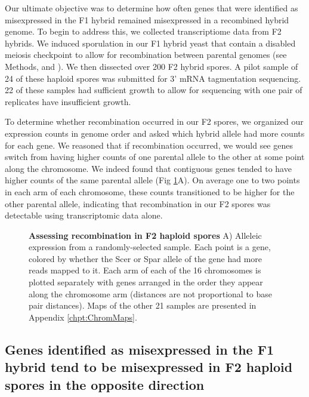Our ultimate objective was to determine how often genes that were identified as misexpressed in the F1 hybrid remained misexpressed in a recombined hybrid genome. To begin to address this, we collected transcriptiome data from F2 hybrids. We induced sporulation in our F1 hybrid yeast that contain a disabled meiosis checkpoint to allow for recombination between parental genomes (see Methods, and \cite{Bozdag2021}). We then dissected over 200 F2 hybrid spores. A pilot sample of 24 of these haploid spores was submitted for 3' mRNA tagmentation sequencing. 22 of these samples had sufficient growth to allow for sequencing with one pair of replicates have insufficient growth. 

To determine whether recombination occurred in our F2 spores, we organized our expression counts in genome order and asked which hybrid allele had more counts for each gene. We reasoned that if recombination occurred, we would see genes switch from having higher counts of one parental allele to the other at some point along the chromosome. We indeed found that contiguous genes tended to have higher counts of the same parental allele (Fig \ref{fig:map}A). On average one to two points in each arm of each chromosome, these counts transitioned to be higher for the other parental allele, indicating that recombination in our F2 spores was  detectable using transcriptomic data alone.

\begin{figure}
    \centering
    \caption{\textbf{Assessing recombination in F2 haploid spores} A) Alleleic expression from a randomly-selected sample. Each point is a gene, colored by whether the Scer or Spar allele of the gene had more reads mapped to it. Each arm of each of the 16 chromosomes is plotted separately with genes arranged in the order they appear along the chromosome arm (distances are not proportional to base pair distances). Maps of the other 21 samples are presented in Appendix \ref{chpt:ChromMaps}.}
    \label{fig:map}
\end{figure}

\subsection{Genes identified as misexpressed in the F1 hybrid tend to be misexpressed in F2 haploid spores in the opposite direction}

